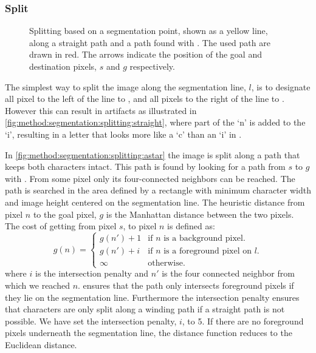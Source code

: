 \subsubsection{Split}
\label{sss:method:segmentaton:splitimage}
	\begin{figure}[t!]
		\centering
		
		\caption{Splitting based on a segmentation point, shown as a yellow line, along \protect{} a straight path and \protect{} a path found with \astar. The used path are drawn in red. The arrows indicate the position of the goal and destination pixels, $s$ and $g$ respectively.}
		\label{fig:method:segmentation:splitting:comparison}
	\end{figure}
	The simplest way to split the image along the segmentation line, $l$, is to designate all pixel to the left of the line to \leftsubimage, and all pixels to the right of the line to \rightsubimage. However this can result in artifacts as illustrated in \cref{fig:method:segmentation:splitting:straight}, where part of the `n' is added to the `i', resulting in a letter that looks more like a `c' than an `i' in \leftsubimage.

	In \cref{fig:method:segmentation:splitting:astar} the image is split along a path that keeps both characters intact. This path is found by looking for a path from $s$ to $g$ with \astar. From some pixel only its four-connected neighbors can be reached. The path is searched in the area defined by a rectangle with minimum character width and image height centered on the segmentation line. The heuristic distance from pixel $n$ to the goal pixel, $g$ is the Manhattan distance between the two pixels.
	The cost of getting from pixel $s$, to pixel $n$ is defined as:
	\begin{equation}\label{eq:method:segmentation:costFunction}
		g(n) = 
		\begin{cases}
			g(n') + 1	& \text{if } n \text{ is a background pixel.}\\
			g(n') + i 	& \text{if } n \text{ is a foreground pixel on $l$.}\\
			\infty 		& \text{otherwise.}
		\end{cases}
	\end{equation}
	where $i$ is the intersection penalty and $n'$ is the four connected neighbor from which we reached $n$.  ensures that the path only intersects foreground pixels if they lie on the segmentation line. Furthermore the intersection penalty ensures that characters are only split along a winding path if a straight path is not possible. We have set the intersection penalty, $i$, to 5. If there are no foreground pixels underneath the segmentation line, the distance function reduces to the Euclidean distance.

